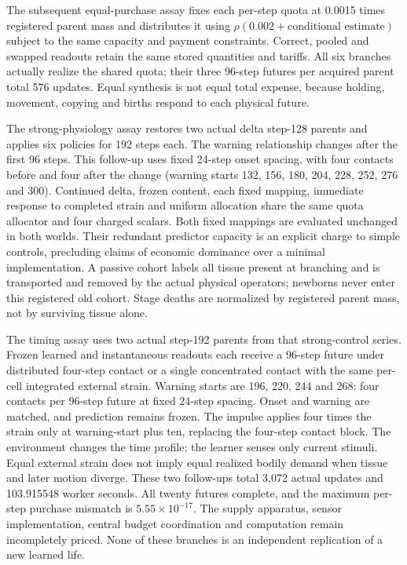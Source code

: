 The subsequent equal-purchase assay fixes each per-step quota at 0.0015 times registered parent mass and distributes it using $\rho(0.002+\text{conditional estimate})$ subject to the same capacity and payment constraints. Correct, pooled and swapped readouts retain the same stored quantities and tariffs. All six branches actually realize the shared quota; their three 96-step futures per acquired parent total 576 updates. Equal synthesis is not equal total expense, because holding, movement, copying and births respond to each physical future.

The strong-physiology assay restores two actual delta step-128 parents and applies six policies for 192 steps each. The warning relationship changes after the first 96 steps. This follow-up uses fixed 24-step onset spacing, with four contacts before and four after the change (warning starts 132, 156, 180, 204, 228, 252, 276 and 300). Continued delta, frozen content, each fixed mapping, immediate response to completed strain and uniform allocation share the same quota allocator and four charged scalars. Both fixed mappings are evaluated unchanged in both worlds. Their redundant predictor capacity is an explicit charge to simple controls, precluding claims of economic dominance over a minimal implementation. A passive cohort labels all tissue present at branching and is transported and removed by the actual physical operators; newborns never enter this registered old cohort. Stage deaths are normalized by registered parent mass, not by surviving tissue alone.

The timing assay uses two actual step-192 parents from that strong-control series. Frozen learned and instantaneous readouts each receive a 96-step future under distributed four-step contact or a single concentrated contact with the same per-cell integrated external strain. Warning starts are 196, 220, 244 and 268: four contacts per 96-step future at fixed 24-step spacing. Onset and warning are matched, and prediction remains frozen. The impulse applies four times the strain only at warning-start plus ten, replacing the four-step contact block. The environment changes the time profile; the learner senses only current stimuli. Equal external strain does not imply equal realized bodily demand when tissue and later motion diverge. These two follow-ups total 3,072 actual updates and 103.915548 worker seconds. All twenty futures complete, and the maximum per-step purchase mismatch is $5.55\times10^{-17}$. The supply apparatus, sensor implementation, central budget coordination and computation remain incompletely priced. None of these branches is an independent replication of a new learned life.
